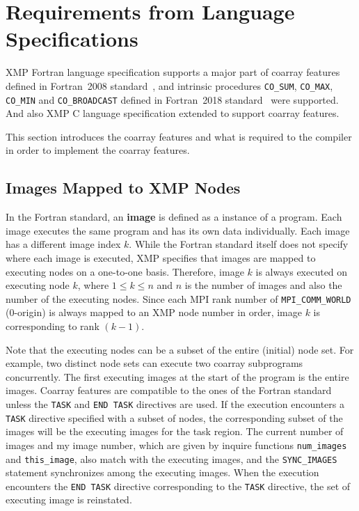 \section{Requirements from Language Specifications}\label{sec:spec}

XMP Fortran language specification supports a major part of coarray features defined in 
Fortran~2008 standard~\cite{F08}, and intrinsic procedures 
{\tt CO\_SUM}, {\tt CO\_MAX}, {\tt CO\_MIN} and {\tt CO\_BROADCAST} defined in 
Fortran~2018 standard~\cite{F18} were supported.
And also XMP C language specification extended to support coarray features.

This section introduces the coarray features and what is required
to the compiler in order to implement the coarray features.


\subsection{Images Mapped to XMP Nodes}\label{sec:spec-image}

In the Fortran standard, an {\bf image} is defined as a instance of a program. 
Each image executes the same program and has its own data individually.
Each image has a different image index $k$.
While the Fortran standard itself does not specify where each image is executed, 
XMP specifies that images are mapped to executing nodes on a one-to-one basis.
Therefore, image $k$ is always executed on executing node $k$, where $1 \leq k \leq n$ and 
$n$ is the number of images and also the number of the executing nodes. 
Since each MPI rank number of {\tt MPI\_COMM\_WORLD} (0-origin) is 
always mapped to an XMP node number in order, image $k$ is corresponding to 
rank $(k - 1)$.

Note that the executing nodes can be a subset of the entire (initial) node set. 
For example, two distinct node sets can execute two coarray subprograms concurrently.
The first executing images at the start of the program is the entire images.
Coarray features are compatible to the ones of the Fortran standard unless 
the {\tt TASK} and {\tt END TASK} directives are used.
If the execution encounters a {\tt TASK} directive specified with a subset of nodes, 
the corresponding subset of the images will be the executing images for the task region. 
The current number of images and my image number, which are given by inquire functions
{\tt num\_images} and {\tt this\_image}, also match with the executing images, and
the {\tt SYNC\_IMAGES} statement synchronizes among the executing images.
When the execution encounters the {\tt END TASK} directive corresponding to the
{\tt TASK} directive, the set of executing image is reinstated.

